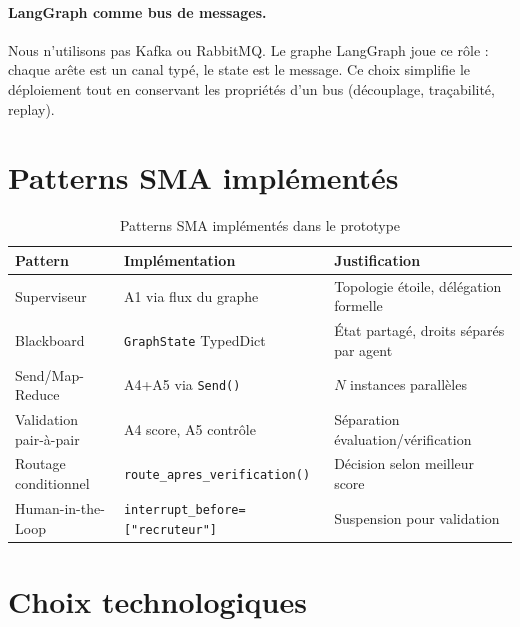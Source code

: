 \documentclass[12pt,a4paper]{report}
\begin{document}
\paragraph{LangGraph comme bus de messages.}
Nous n'utilisons pas Kafka ou RabbitMQ. Le graphe LangGraph joue ce rôle : chaque
arête est un canal typé, le state est le message. Ce choix simplifie le déploiement
tout en conservant les propriétés d'un bus (découplage, traçabilité, replay).

\section{Patterns SMA implémentés}

\begin{table}[H]
\centering
\caption{Patterns SMA implémentés dans le prototype}
\label{tab:patterns}
\begin{tabularx}{\textwidth}{L{3cm}L{4cm}L{6cm}}
\toprule
\textbf{Pattern} & \textbf{Implémentation} & \textbf{Justification} \\
\midrule
Superviseur & A1 via flux du graphe & Topologie étoile, délégation formelle \\
Blackboard & \texttt{GraphState} TypedDict & État partagé, droits séparés par agent \\
Send/Map-Reduce & A4+A5 via \texttt{Send()} & $N$ instances parallèles \\
Validation pair-à-pair & A4 score, A5 contrôle & Séparation évaluation/vérification \\
Routage conditionnel & \texttt{route\_apres\_verification()} & Décision selon meilleur score \\
Human-in-the-Loop & \texttt{interrupt\_before=["recruteur"]} & Suspension pour validation \\
\bottomrule
\end{tabularx}
\end{table}

\section{Choix technologiques}
\end{document}

